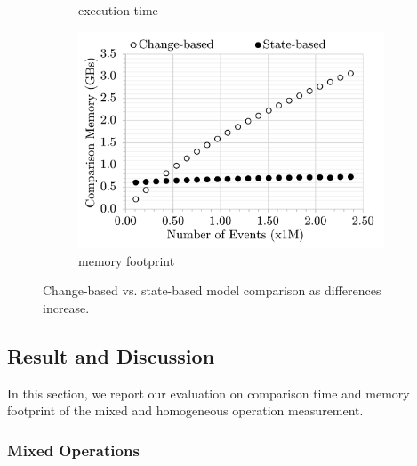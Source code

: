 \documentclass{jot}
\begin{document}
\begin{figure}
\begin{subfigure}[t]{\linewidth}
        \caption{execution time}
        \label{fig:time_diffs}
    \end{subfigure}
    \begin{subfigure}[t]{\linewidth}
        \includegraphics[width=\linewidth]{mixed-memory-events}
        \caption{memory footprint}
        \label{fig:memory_diffs}
    \end{subfigure}
    \caption{Change-based vs. state-based model comparison as differences increase.}
    \label{fig:change_vs_state}
\end{figure}

\vspace{-5pt}
\subsection{Result and Discussion}
\label{sec:discussion}
In this section, we report our evaluation on comparison time and memory footprint of the mixed and homogeneous operation measurement. 

\vspace{-5pt}
\subsubsection{Mixed Operations}
\label{sec:mixed-operation}
\end{document}
